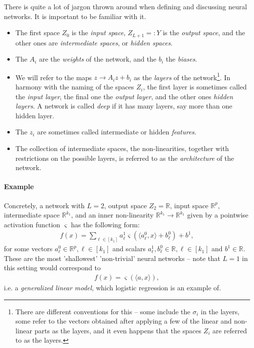 \documentclass{article}
\newcommand{\sprod}[1]{\langle #1 \rangle}
\newcommand{\R}{\mathbb{R}}
\begin{document}
There is quite a lot of jargon thrown around when defining and discussing neural networks. It is important to be familiar with it.
\begin{itemize}
\item The first space $Z_0$ is the \emph{input space}, $Z_{L+1}=:Y$ is the \emph{output space}, and the other ones are \emph{intermediate spaces}, or \emph{hidden spaces}. 
\item The $A_i$ are the \emph{weights} of the network, and the $b_i$ the \emph{biases}.
\item We will refer to the maps $z\to A_i z + b_i$ as the \emph{layers} of the network\footnote{There are different conventions for this -- some include the $\sigma_i$ in the layers, some refer to the vectors obtained after applying a few of the linear and non-linear parts as the layers, and it even happens that the spaces $Z_i$ are referred to as the layers.}. In harmony with the naming of the spaces $Z_i$, the first layer is sometimes called the \emph{input layer}, the final one the \emph{output layer}, and the other ones \emph{hidden layers}. A network is called \emph{deep} if it has many layers, say more than one hidden layer.
\item The $z_i$ are sometimes called intermediate or hidden \emph{features}.
\item The collection of intermediate spaces, the non-linearities, together with restrictions on the possible layers, is referred to as the \emph{architecture} of the network. 
\end{itemize}

\paragraph{Example} Concretely, a network with $L=2$, output space $Z_2=\R$, input space $\R^p$, intermediate space $\R^{k_1}$, and an inner non-linearity $\R^{k_1} \to \R^{k_1}$ given by a pointwise activation function $\varsigma$ has the following form:
\begin{align*}
    f(x) = \sum_{\ell \in [k_1]} a_{\ell}^1 \varsigma(\sprod{a_\ell^0,x}+b_\ell^0) + b^1,
\end{align*}
for some vectors $a_\ell^0 \in \R^p, \ell \in [k_1]$ and scalars $a_\ell^1, b_\ell^0 \in \R, \ell \in [k_1]$ and $b^1\in \R$. These are the most 'shallowest' 'non-trivial' neural networks -- note that $L=1$ in this setting would correspond to
\begin{align*}
    f(x) = \varsigma(\sprod{a,x}),
\end{align*}
i.e. a \emph{generalized linear model}, which logistic regression is an example of. \newline
\end{document}
